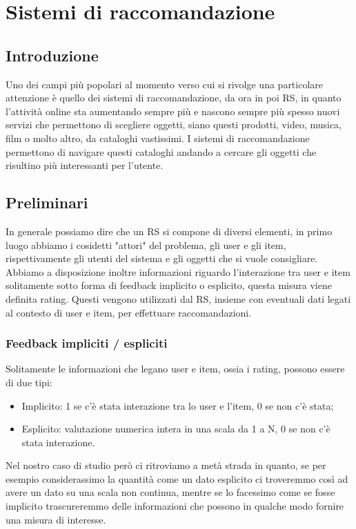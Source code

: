 
\hypertarget{(chap:capitolo4)}{}
\chapter{Sistemi di raccomandazione}
\section{Introduzione}
Uno dei campi più popolari al momento verso cui si rivolge una particolare attenzione è quello dei sistemi di raccomandazione, da ora in poi RS, in quanto l'attività online sta aumentando sempre più e nascono sempre più spesso nuovi servizi che permettono di scegliere oggetti, siano questi prodotti, video, musica, film o molto altro, da cataloghi vastissimi. I sistemi di raccomandazione permettono di navigare questi cataloghi andando a cercare gli oggetti che risultino più interessanti per l'utente.

\section{Preliminari}
In generale possiamo dire che un RS si compone di diversi elementi, in primo luogo abbiamo i cosidetti "attori" del problema, gli user e gli item, rispettivamente gli utenti del sistema e gli oggetti che si vuole consigliare. Abbiamo a disposizione inoltre informazioni riguardo l'interazione tra user e item solitamente sotto forma di feedback implicito o esplicito, questa misura viene definita rating. Questi vengono utilizzati dal RS, insieme con eventuali dati legati al contesto di user e item, per effettuare raccomandazioni.

\subsection{Feedback impliciti / espliciti}
Solitamente le informazioni che legano user e item, ossia i rating, possono essere di due tipi:
\begin{itemize}
	\item Implicito: 1 se c'è stata interazione tra lo user e l'item, 0 se non c'è stata;
	\item Esplicito: valutazione numerica intera in una scala da 1 a N, 0 se non c'è stata interazione.
\end{itemize}

Nel nostro caso di studio però ci ritroviamo a metà strada in quanto, se per esempio considerassimo la quantità come un dato esplicito ci troveremmo così ad avere un dato su una scala non continua, mentre se lo facessimo come se fosse implicito trascureremmo delle informazioni che possono in qualche modo fornire una misura di interesse.

